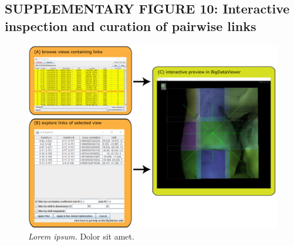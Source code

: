\documentclass[]{spie}  %
\begin{document}
\subsection*{SUPPLEMENTARY FIGURE 10: Interactive inspection and curation of pairwise links}
\vspace{1mm}
\begin{figure}[h!]
\includegraphics[width=\textwidth]{Supp-Link-Explorer.png}
\vspace{-2.0mm}
\caption{\hspace{-0.5mm} \emph{Lorem ipsum.} Dolor sit amet.
}
\label{fig:sup-fig-link-explorer}
\end{figure}

\pagebreak
\end{document}
